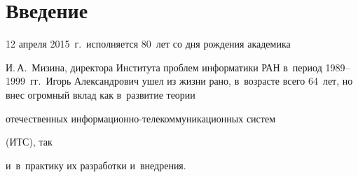 




\vspace*{-9pt}










      \thispagestyle{headings}








\section{Введение}





\vspace*{-3pt}








   12 апреля 2015~г.\ исполняется 80~лет со дня рождения академика


И.\,А.~Мизина, директора Института проблем информатики РАН в~период 1989--1999~гг.\ Игорь Александрович ушел из жизни рано, в~возрасте всего 64~лет, но внес огромный вклад как в~развитие теории


отечественных информационно-те\-ле\-ком\-му\-ни\-ка\-ци\-он\-ных сис\-тем


(ИТС), так


и~в~практику их разработки и~внедрения.





\pagebreak





\





\vspace*{-12pt}













